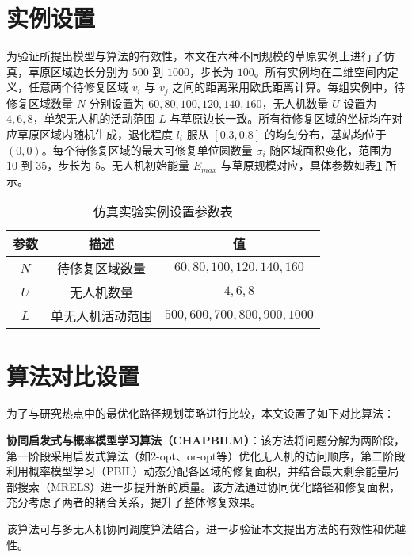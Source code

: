 \documentclass[AutoFakeBold]{LZUThesis}
\begin{document}
\section{实例设置}
为验证所提出模型与算法的有效性，本文在六种不同规模的草原实例上进行了仿真，草原区域边长分别为 $500$ 到 $1000$，步长为 $100$。所有实例均在二维空间内定义，任意两个待修复区域 $v_i$ 与 $v_j$ 之间的距离采用欧氏距离计算。每组实例中，待修复区域数量 $N$ 分别设置为 $60, 80, 100, 120, 140, 160$，无人机数量 $U$ 设置为 $4, 6, 8$，单架无人机的活动范围 $L$ 与草原边长一致。所有待修复区域的坐标均在对应草原区域内随机生成，退化程度 $l_i$ 服从 $[0.3, 0.8]$ 的均匀分布，基站均位于 $(0,0)$。每个待修复区域的最大可修复单位圆数量 $\sigma_i$ 随区域面积变化，范围为 $10$ 到 $35$，步长为 $5$。无人机初始能量 $E_{max}$ 与草原规模对应，具体参数如表\ref{tbl_instance_setting} 所示。

\begin{table}[H]
	\centering
	\caption{仿真实验实例设置参数表}
	\setlength{\tabcolsep}{18pt} %
	\begin{tabular}{ccc}
		\toprule
		参数  & 描述       & 值                               \\
		\midrule
		$N$ & 待修复区域数量  & $60, 80, 100, 120, 140, 160$    \\
		$U$ & 无人机数量    & $4, 6, 8$                       \\
		$L$ & 单无人机活动范围 & $500, 600, 700, 800, 900, 1000$ \\
		\bottomrule
	\end{tabular}
	\label{tbl_instance_setting}
\end{table}

\section{算法对比设置}

为了与研究热点中的最优化路径规划策略\cite{aggarwal2020path}进行比较，本文设置了如下对比算法：

\textbf{协同启发式与概率模型学习算法（CHAPBILM）\cite{JIAO2024108084}}：该方法将问题分解为两阶段，第一阶段采用启发式算法（如2-opt、or-opt等）优化无人机的访问顺序，第二阶段利用概率模型学习（PBIL）动态分配各区域的修复面积，并结合最大剩余能量局部搜索（MRELS）进一步提升解的质量。该方法通过协同优化路径和修复面积，充分考虑了两者的耦合关系，提升了整体修复效果。

该算法可与多无人机协同调度算法结合，进一步验证本文提出方法的有效性和优越性。
\end{document}
